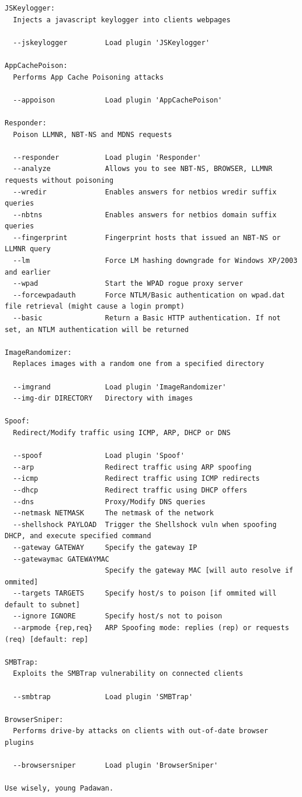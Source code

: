 \documentclass{article}
\begin{document}
\begin{lstlisting}
JSKeylogger:
  Injects a javascript keylogger into clients webpages

  --jskeylogger         Load plugin 'JSKeylogger'

AppCachePoison:
  Performs App Cache Poisoning attacks

  --appoison            Load plugin 'AppCachePoison'

Responder:
  Poison LLMNR, NBT-NS and MDNS requests

  --responder           Load plugin 'Responder'
  --analyze             Allows you to see NBT-NS, BROWSER, LLMNR requests without poisoning
  --wredir              Enables answers for netbios wredir suffix queries
  --nbtns               Enables answers for netbios domain suffix queries
  --fingerprint         Fingerprint hosts that issued an NBT-NS or LLMNR query
  --lm                  Force LM hashing downgrade for Windows XP/2003 and earlier
  --wpad                Start the WPAD rogue proxy server
  --forcewpadauth       Force NTLM/Basic authentication on wpad.dat file retrieval (might cause a login prompt)
  --basic               Return a Basic HTTP authentication. If not set, an NTLM authentication will be returned

ImageRandomizer:
  Replaces images with a random one from a specified directory

  --imgrand             Load plugin 'ImageRandomizer'
  --img-dir DIRECTORY   Directory with images

Spoof:
  Redirect/Modify traffic using ICMP, ARP, DHCP or DNS

  --spoof               Load plugin 'Spoof'
  --arp                 Redirect traffic using ARP spoofing
  --icmp                Redirect traffic using ICMP redirects
  --dhcp                Redirect traffic using DHCP offers
  --dns                 Proxy/Modify DNS queries
  --netmask NETMASK     The netmask of the network
  --shellshock PAYLOAD  Trigger the Shellshock vuln when spoofing DHCP, and execute specified command
  --gateway GATEWAY     Specify the gateway IP
  --gatewaymac GATEWAYMAC
                        Specify the gateway MAC [will auto resolve if ommited]
  --targets TARGETS     Specify host/s to poison [if ommited will default to subnet]
  --ignore IGNORE       Specify host/s not to poison
  --arpmode {rep,req}   ARP Spoofing mode: replies (rep) or requests (req) [default: rep]

SMBTrap:
  Exploits the SMBTrap vulnerability on connected clients

  --smbtrap             Load plugin 'SMBTrap'

BrowserSniper:
  Performs drive-by attacks on clients with out-of-date browser plugins

  --browsersniper       Load plugin 'BrowserSniper'

Use wisely, young Padawan.
\end{lstlisting}
\end{document}
